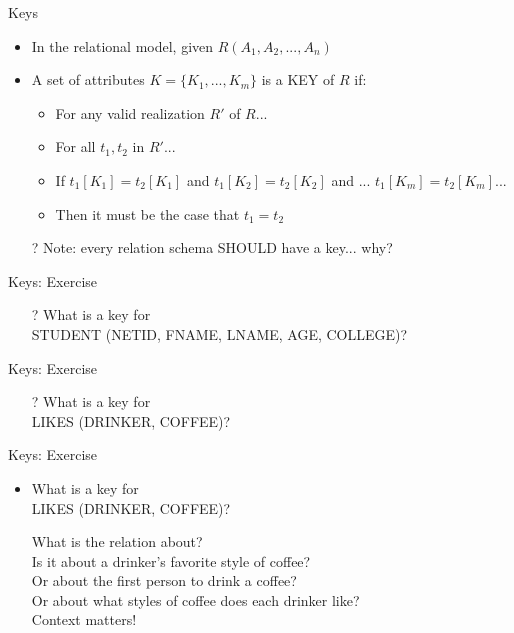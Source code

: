 \documentclass[aspectratio=169]{beamer}
\begin{document}
\begin{frame}{Keys}

\begin{itemize}
\item In the relational model, given $R(A_1, A_2, ..., A_n)$
\item A set of attributes $K = \{K_1, ..., K_m\}$ is a KEY of $R$ if:
	\begin{itemize}
	\item For any valid realization $R'$ of $R$...
	\item For all $t_1, t_2$ in $R'$...
	\item If $t_1[K_1] = t_2[K_1]$ and $t_1[K_2] = t_2[K_2]$ and ... 
		$t_1[K_m] = t_2[K_m]$...
	\item Then it must be the case that $t_1 = t_2$ 
	\end{itemize}
\item[?] Note: every relation schema SHOULD have a key... why?
\end{itemize}
\end{frame}
\begin{frame}{Keys: Exercise}
\begin{itemize}
\item[?] What is a key for \\STUDENT (NETID, FNAME, LNAME, AGE, COLLEGE)?

\end{itemize}
\end{frame}
\begin{frame}{Keys: Exercise}
\begin{itemize}
\item[?] What is a key for \\ LIKES (DRINKER, COFFEE)?
\end{itemize}
\end{frame}
\begin{frame}{Keys: Exercise}
\begin{itemize}
\item What is a key for \\ LIKES (DRINKER, COFFEE)?

What is the relation about?\\
Is it about a drinker's favorite style of coffee?\\
Or about the first person to drink a coffee?\\
Or about what styles of coffee does each drinker like?\\
Context matters!\\
\end{itemize}
\end{frame}
\end{document}
